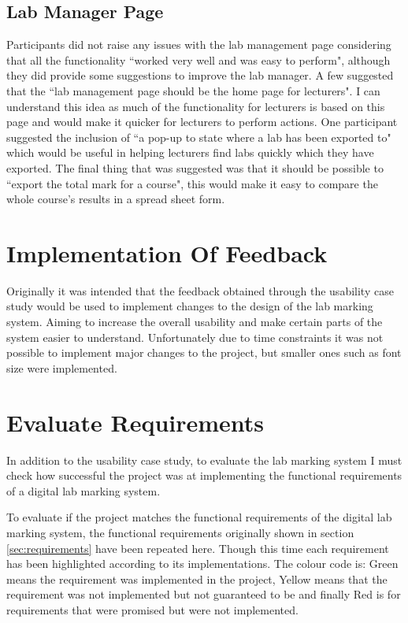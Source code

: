 \documentclass[11pt]{report}
\begin{document}
\subsection*{Lab Manager Page}

Participants did not raise any issues with the lab management page considering that all the functionality ``worked very well and was easy to perform", although they did provide some suggestions to improve the lab manager. A few suggested that the ``lab management page should be the home page for lecturers". I can understand this idea as much of the functionality for lecturers is based on this page and would make it quicker for lecturers to perform actions. One participant suggested the inclusion of ``a pop-up to state where a lab has been exported to" which would be useful in helping lecturers find labs quickly which they have exported. The final thing that was suggested was that it should be possible to ``export the total mark for a course", this would make it easy to compare the whole course's results in a spread sheet form.



\section{Implementation Of Feedback}

Originally it was intended that the feedback obtained through the usability case study would be used to implement changes to the design of the lab marking system. Aiming to increase the overall usability and make certain parts of the system easier to understand. Unfortunately due to time constraints it was not possible to implement major changes to the project, but smaller ones such as font size were implemented. 


\section{Evaluate Requirements}

In addition to the usability case study, to evaluate the lab marking system I must check how successful the project was at implementing the functional requirements of a digital lab marking system. 

To evaluate if the project matches the functional requirements of the digital lab marking system, the functional requirements originally shown in section \ref{sec:requirements} have been repeated here. Though this time each requirement has been highlighted according to its implementations. The colour code is: Green means the requirement was implemented in the project, Yellow means that the requirement was not implemented but not guaranteed to be and finally Red is for requirements that were promised but were not implemented.   
\end{document}
